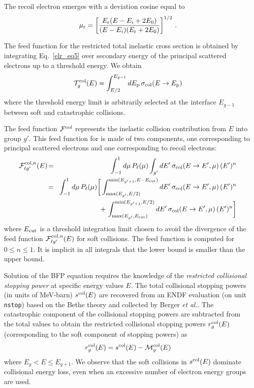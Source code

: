 \noindent The recoil electron emerges with a deviation cosine equal to
  \begin{equation}
    \mu_{\rm r} = \left[{E_{\rm r}(E-E_i+2E_0)\over (E-E_i)(E_{\rm r}+2E_0)}
    \right]^{1/2} \, .
  \label{elr_eq7}
  \end{equation}

The feed function for the restricted total inelastic cross section is
obtained by integrating Eq.~\ref{elr_eq5} over secondary energy of the
principal scattered electrons up to a threshold energy. We obtain
  \begin{equation}
     {\cal T}^{\rm col}_g(E)=\int_{E/2}^{E_{g-1}} dE_{\rm p} \,
     \sigma_{\rm col}(E\rightarrow E_{\rm p})
  \label{elr_eq8}
  \end{equation}
\noindent where the threshold energy limit is arbitrarily selected at the
interface $E_{g-1}$ between soft and catastrophic collisions.

The feed function ${\cal F}^{\rm col}$ represents the inelastic collision
contribution from $E$ into group $g'$. This feed function for is made of
two components, one corresponding to principal scattered electrons and one
corresponding to recoil electrons:
  \begin{eqnarray}
    \nonumber {\cal F}^{{\rm col},n}_{\ell g'}(E) \negthinspace
    &=& \negthinspace \int_{-1}^1 d\mu \,P_\ell(\mu) \int_{g'} dE'
    \, \sigma_{\rm col}(E\rightarrow E',\mu)\,(E')^n \\
    \nonumber &=& \negthinspace \int_{-1}^1 d\mu \, P_\ell(\mu)
    \bigg[ \int_{\max(E_{g'},E/2)}^{\min(E_{g'+1},E-E_{\rm cut})} dE' \,
    \sigma_{\rm col}(E\rightarrow E',\mu)\,(E')^n \\
    &~& + \,\int_{\max(E_{g'},E_{\rm cut})}^{\min(E_{g'+1},E/2)} dE' \,
    \sigma_{\rm col}(E\rightarrow E',\mu)\,(E')^n \bigg]
  \label{elr_eq9}
  \end{eqnarray}
\noindent where $E_{\rm cut}$ is a threshold integration limit chosen to avoid
the divergence of the feed function ${\cal F}^{{\rm col},n}_{\ell g'}(E)$ for
soft collisions. The feed function is computed for $0\le n\le 1$. It is
implicit in all integrals that the lower bound is smaller than the upper
bound.

Solution of the BFP equation requires the knowledge of the {\sl restricted
collisional stopping power}  at specific
energy values $E$. The total collisional stopping powers (in units of MeV-barn)
$s^{\rm col}(E)$ are recovered from an ENDF evaluation (on unit {\tt nstop})
based on the Bethe theory and collected by Berger {\sl et al.}\cite{ICRU37}.
The catastrophic component of the collisional stopping powers are subtracted
from the total values to obtain the restricted collisional stopping powers
$r_g^{\rm col}(E)$ (corresponding to the soft component of stopping powers) as
  \begin{equation}
   r_g^{\rm col}(E) = s^{\rm col}(E) - {\cal M}^{\rm col}_g(E)
  \label{elr_eq10}
  \end{equation}
\noindent where $E_g < E \le E_{g+1}$. We observe that the soft collisions
in $s^{\rm col}(E)$ dominate collisional energy loss, even when an excessive
number of electron energy groups are used.

